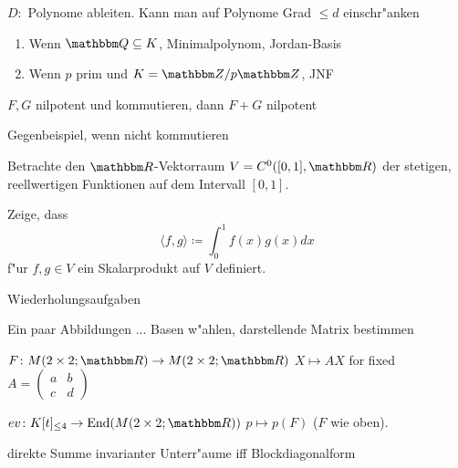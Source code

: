 \documentclass[a4,11pt]{article}
\DeclareMathOperator{\End}{End}
\begin{document}
\vspace*{-17mm}
{
\kopf
}


\begin{aufgabe}[4 Punkte]

  $D \colon$ Polynome ableiten. Kann man auf Polynome Grad $\le d$ einschr"anken
  
\begin{enumerate}
\item Wenn $\Q \subseteq K$, Minimalpolynom, Jordan-Basis
\item Wenn $p$ prim und $K = \Z/p\Z$, JNF
\end{enumerate}

\end{aufgabe}

\begin{aufgabe}[4 Punkte]
  $F,G$ nilpotent und kommutieren, dann $F+G$ nilpotent

  Gegenbeispiel, wenn nicht kommutieren
\end{aufgabe}


\begin{aufgabe}[4 Punkte]
Betrachte den $\R$-Vektorraum $V=C^0([0,1],\R)$ der stetigen,
reellwertigen Funktionen auf dem Intervall $[0,1]$.

Zeige, dass
$$
\langle f,g \rangle \coloneq \int_0^1 f(x)g(x) dx
$$
f"ur $f,g \in V$ ein Skalarprodukt auf $V$ definiert.

\end{aufgabe}

Wiederholungsaufgaben

\begin{aufgabe}
  Ein paar Abbildungen ... Basen w"ahlen, darstellende Matrix bestimmen

  $F \colon M(2 \times 2; \R) \to M(2 \times 2; \R)$ $X \mapsto AX$
  for fixed $A =
  \left( \begin{smallmatrix}a&b\\c&d\end{smallmatrix}\right)$  
  
  $ev \colon K[t]_{\le 4} \to \End(M(2 \times 2; \R))$ $p \mapsto
  p(F)$ ($F$ wie oben).
\end{aufgabe}

\begin{aufgabe}
  direkte Summe invarianter Unterr"aume iff Blockdiagonalform
\end{aufgabe}
\end{document}
